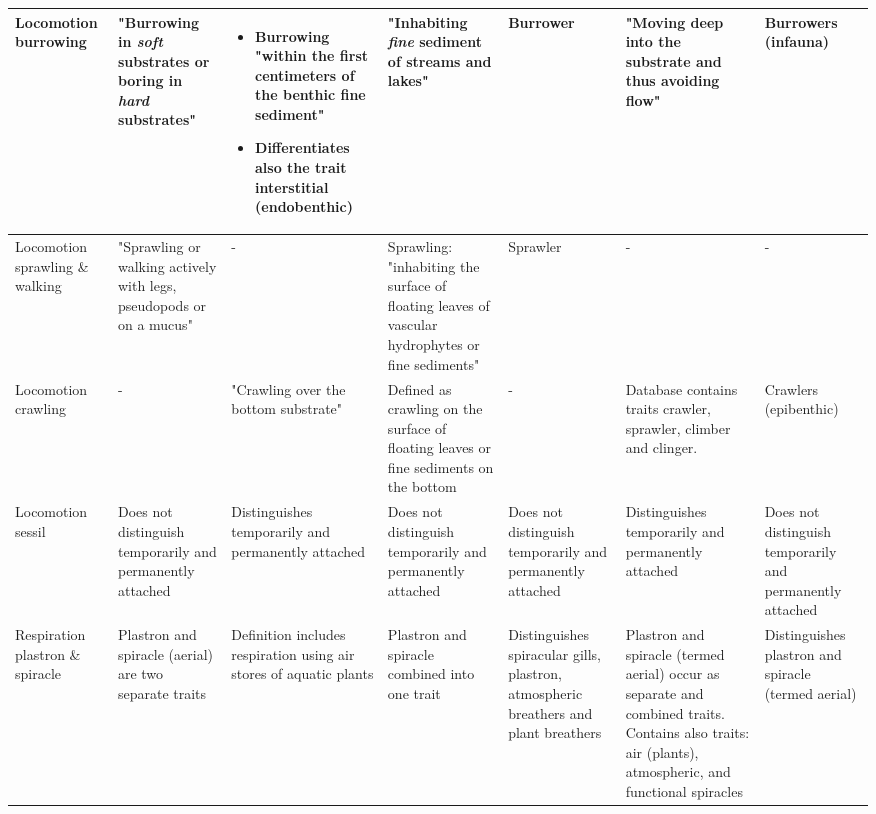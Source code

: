 \documentclass[../Draft_harmonization_paper.tex]{subfiles}
\begin{document}
\begin{landscape}
\begin{longtable}{m{1.7cm}|m{3cm}|m{3cm}|m{3cm}|m{3cm}|m{3cm}|m{3cm}}
        \\
        Locomotion burrowing & 
        "Burrowing in \textit{soft} substrates or boring in \textit{hard} substrates" & 
        \begin{itemize}
            \item Burrowing "within the first centimeters of the benthic fine sediment"
            \item Differentiates also the trait interstitial (endobenthic)
        \end{itemize} & 
        "Inhabiting \textit{fine} sediment of streams and lakes" &
        Burrower & 
        "Moving deep into the substrate and thus avoiding flow" &
        Burrowers (infauna)
        \\
        \hline
        Locomotion sprawling \& walking & 
        "Sprawling or walking actively with legs, pseudopods or on a mucus" &
        - & 
        Sprawling: "inhabiting the surface of floating leaves of vascular hydrophytes or fine sediments" & 
        Sprawler &
        - & 
        - \\
        \hline
        Locomotion crawling & 
        - &
        "Crawling over the bottom substrate" & 
        Defined as crawling on the surface of floating leaves or fine sediments on the bottom & 
        - & 
        Database contains traits crawler, 
        sprawler, climber and clinger. &
        Crawlers (epibenthic) \\
        \hline
        Locomotion sessil & 
        Does not distinguish temporarily and permanently attached & 
        Distinguishes temporarily and permanently attached & 
        Does not distinguish temporarily and permanently attached & 
        Does not distinguish temporarily and permanently attached & 
        Distinguishes temporarily and permanently attached & 
        Does not distinguish temporarily and permanently attached \\
        \hline
        \hline
        Respiration plastron \& spiracle & 
        Plastron and spiracle (aerial) are two separate traits & 
        Definition includes respiration using air stores of aquatic plants & 
        Plastron and spiracle combined into one trait & 
        Distinguishes spiracular gills, plastron, atmospheric breathers and plant breathers &
        Plastron and spiracle (termed aerial) occur as separate and combined traits. Contains also traits: air (plants), atmospheric, and functional spiracles &
        Distinguishes plastron and spiracle (termed aerial) \\

\end{longtable}
\end{landscape}
\end{document}
